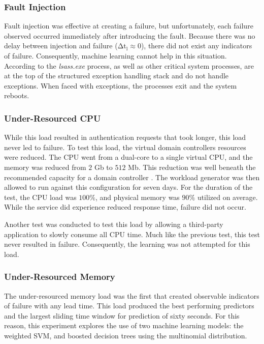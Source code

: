 \subsubsection{Fault Injection}
Fault injection was effective at creating a failure, but unfortunately, each
failure observed occurred immediately after introducing the fault.  Because
there was no delay between injection and failure ($\mathrm{\Delta t_l \approx
0}$), there did not exist any indicators of failure.  Consequently, machine
learning cannot help in this situation.  According to \citet{russinovich2009}
the \emph{lsass.exe} process, as well as other critical system processes, are
at the top of the structured exception handling stack and do not handle
exceptions.  When faced with exceptions, the processes exit and the system
reboots.

\subsubsection{Under-Resourced \ac{CPU}}
While this load resulted in authentication requests that took longer, this load
never led to failure.  To test this load, the virtual domain controllers
resources were reduced.  The \ac{CPU} went from a dual-core to a single virtual
CPU, and the memory was reduced from $2$ Gb to $512$ Mb.  This reduction was
well beneath the recommended capacity for a domain controller \citep{mak12}.
The workload generator was then allowed to run against this configuration for
seven days.  For the duration of the test, the \ac{CPU} load was $100\%$, and
physical memory was $90\%$ utilized on average.  While the service did
experience reduced response time, failure did not occur.

Another test was conducted to test this load by allowing a third-party
application to slowly consume all \ac{CPU} time.  Much like the previous test,
this test never resulted in failure.  Consequently, the learning was not
attempted for this load.

\subsubsection{Under-Resourced Memory}
The under-resourced memory load was the first that created observable
indicators of failure with any lead time.  This load produced the best
performing predictors and the largest sliding time window for prediction of
sixty seconds.  For this reason, this experiment explores the use of two
machine learning models: the weighted \ac{SVM}, and boosted decision trees
using the multinomial distribution.  

